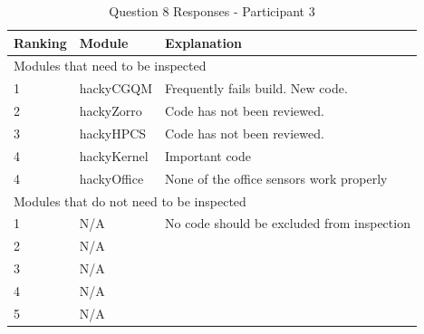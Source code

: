\begin{table}[!h]
  \begin{center}
    \caption{Question 8 Responses - Participant 3}
    \label{tab:pre-selection-questionnaire-results-8-p3}
    \begin{tabular}{|p{2.0cm}|p{4.0cm}|p{7.0cm}|} \hline
{\bf Ranking} & {\bf Module} & {\bf Explanation} \\ \hline
\multicolumn{3}{|p{13.0cm}|}{Modules that need to be inspected} \\ \hline
1 & hackyCGQM & Frequently fails build. New code. \\ \hline
2 & hackyZorro & Code has not been reviewed. \\ \hline
3 & hackyHPCS & Code has not been reviewed. \\ \hline
4 & hackyKernel & Important code \\ \hline
4 & hackyOffice & None of the office sensors work properly \\ \hline
\multicolumn{3}{|p{13.0cm}|}{Modules that do not need to be inspected}  \\ \hline
1 & N/A & No code should be excluded from inspection \\ \hline
2 & N/A & \\ \hline
3 & N/A & \\ \hline
4 & N/A & \\ \hline
5 & N/A & \\ \hline
    \end{tabular}
  \end{center}
\end{table}


